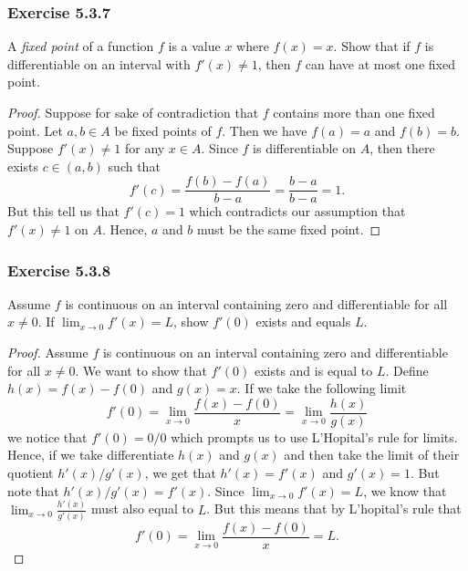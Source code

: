\subsubsection{Exercise 5.3.7} A \textit{fixed point} of a function \( f  \) is a value \( x  \) where \( f(x) = x  \). Show that if \( f  \) is differentiable on an interval with \( f'(x) \neq 1  \), then \( f  \) can have at most one fixed point.
\begin{proof}
Suppose for sake of contradiction that \( f  \) contains more than one fixed point. Let \( a, b \in A  \) be fixed points of \( f  \). Then we have \( f(a) = a  \) and \( f(b) = b  \). Suppose \( f'(x) \neq 1  \) for any \( x \in A  \). Since \( f  \) is differentiable on \( A  \), then there exists \( c \in (a,b)  \) such that 
\[  f'(c) = \frac{ f(b) - f(a)  }{ b -a  } = \frac{ b - a  }{ b -a  } = 1. \]
But this tell us that \( f'(c) = 1  \) which contradicts our assumption that \( f'(x) \neq 1   \) on \( A  \). Hence, \( a  \) and \( b  \) must be the same fixed point.
\end{proof}

\subsubsection{Exercise 5.3.8} Assume \( f  \) is continuous on an interval containing zero and differentiable for all \( x \neq 0  \). If \( \lim_{ x \to 0  } f'(x) = L \), show \( f'(0)  \) exists and equals \( L  \).

\begin{proof}
Assume \( f  \) is continuous on an interval containing zero and differentiable for all \( x \neq 0  \). We want to show that \( f'(0)  \) exists and is equal to \( L  \). Define \( h(x) = f(x) - f(0)  \) and \( g(x) = x  \). If we take the following limit 
\[f'(0) =  \lim_{ x \to 0 } \frac{ f(x) - f(0)  }{ x  } = \lim_{ x \to 0  } \frac{ h(x)  }{ g(x)  }   \]
we notice that \( f'(0) = 0 / 0 \) which prompts us to use L'Hopital's rule for limits. Hence, if we take differentiate \( h(x)  \) and \( g(x) \) and then take the limit of their quotient \( h'(x) / g'(x)  \), we get that \( h'(x) = f'(x)  \) and \( g'(x) = 1  \). But note that \( h'(x) / g'(x) = f'(x)  \). Since \( \lim_{ x \to 0 } f'(x) = L  \), we know that \( \lim_{ x \to 0 } \frac{ h'(x)  }{ g'(x)  }  \) must also equal to \( L  \). But this means that by L'hopital's rule that 
\[ f'(0) =  \lim_{ x \to 0 }  \frac{ f(x) - f(0) }{ x  } = L. \]
\end{proof}


